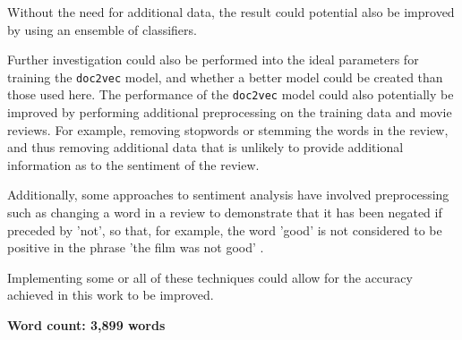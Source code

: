 \documentclass[twocolumn]{article}
\begin{document}
Without the need for additional data, the result could potential also be improved by using an ensemble of classifiers.

Further investigation could also be performed into the ideal parameters for training the \texttt{doc2vec} model, and whether a better model could be created than those used here. The performance of the \texttt{doc2vec} model could also potentially be improved by performing additional preprocessing on the training data and movie reviews. For example, removing stopwords or stemming the words in the review, and thus removing additional data that is unlikely to provide additional information as to the sentiment of the review.

Additionally, some approaches to sentiment analysis have involved preprocessing such as changing a word in a review to demonstrate that it has been negated if preceded by 'not', so that, for example, the word 'good' is not considered to be positive in the phrase 'the film was not good' \cite{pang}.

Implementing some or all of these techniques could allow for the accuracy achieved in this work to be improved.


\textbf{Word count: 3,899 words}

{}

\end{document}
